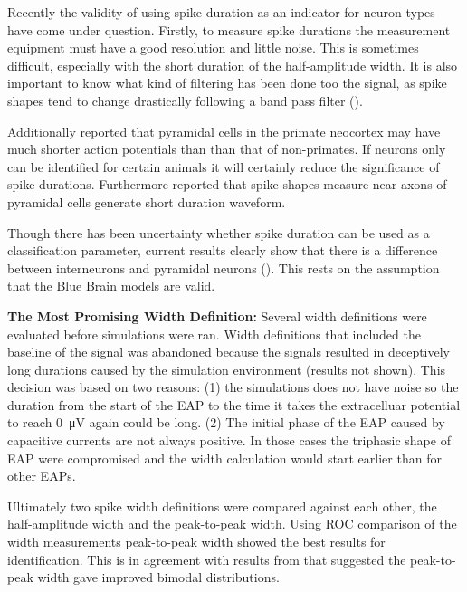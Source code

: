\documentclass[altfont, fleqn]{uiophd}
\renewcommand{\cref}[1]{{\color{viridis_03}\mycref{#1}}}
\begin{document}
Recently the validity of using 
spike duration as an indicator for 
neuron types have come under question. 
Firstly, to measure spike durations the measurement equipment
must have a good resolution and little noise.
This is sometimes difficult, 
especially with the short duration of the 
half-amplitude width. 
It is also important to know what kind of filtering
has been done too the signal, 
as spike shapes tend to change drastically following
a band pass filter 
(\textcite{quian_quiroga_what_2009}). 

Additionally 
\textcite{vigneswaran_large_2011}
reported that pyramidal cells in the primate
neocortex may have much shorter action potentials
than than that of non-primates. 
If neurons only can be identified for
certain animals it will certainly reduce
the significance of spike durations. 
Furthermore
\textcite{robbins_short_2013}
reported that spike shapes measure near axons of
pyramidal cells
generate short duration waveform. 

Though there has been uncertainty whether
spike duration can be used as a classification
parameter, 
current results clearly show that there is a 
difference between interneurons and pyramidal
neurons 
(\cref{fig:4_width_I_II_histograms}). 
This rests on the assumption that
the Blue Brain models are valid.
\newline

\noindent
{\bf The Most Promising Width Definition:}
Several width definitions were evaluated before simulations
were ran. 
Width definitions that included the baseline
of the signal was abandoned because the signals
resulted in deceptively long durations caused by the 
simulation environment (results not shown).
This decision was based on two reasons:
(1) the simulations does not have noise 
so the duration 
from the start of the EAP
to the time it takes the extracelluar potential
to reach 
\SI{0}{\micro\volt} again could be long.
(2) The initial phase of the EAP caused by capacitive currents
are not always positive. 
In those cases the triphasic shape of EAP were compromised
and the width calculation would start earlier than for other EAPs. 

Ultimately two spike width definitions were compared against 
each other, the half-amplitude width and the peak-to-peak width. 
Using ROC comparison
of the width measurements 
peak-to-peak width showed the
best results for identification. 
This is in agreement with results from 
\textcite{bartho_characterization_2004} 
that suggested the peak-to-peak width gave improved
bimodal distributions. 
\end{document}
